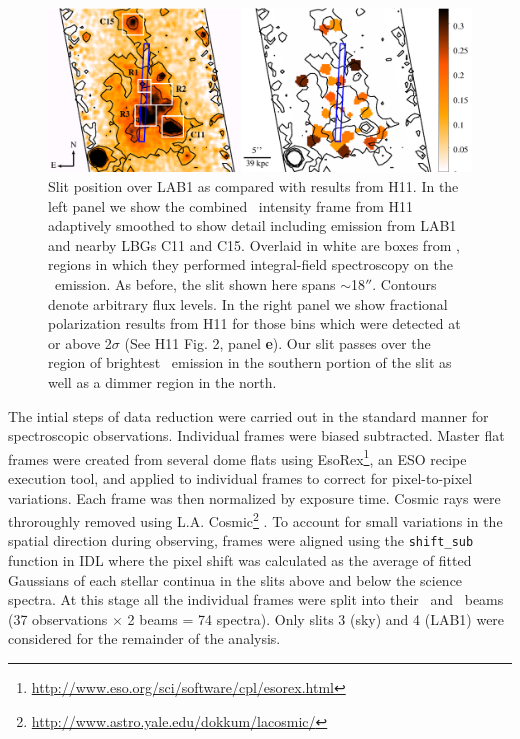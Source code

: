\begin{figure}
\begin{center}
\includegraphics[width=\linewidth]{Figures/lyapol/f2_v2.pdf}
\caption[Slit position over LAB1 as compared with results from Hayes et. 2011]{Slit position over LAB1 as compared with results from H11. In the left panel we show the combined \lya~intensity frame from H11 adaptively smoothed to show detail including emission from LAB1 and nearby LBGs C11 and C15. Overlaid in white are boxes from \cite{Weijmans2010}, regions in which they performed integral-field spectroscopy on the \lya~emission. As before, the slit shown here spans $\sim$18$''$.  Contours denote arbitrary flux levels. In the right panel we show fractional polarization results from H11 for those bins which were detected at or above 2$\sigma$ (See H11 Fig. 2, panel \textbf{e}). Our slit passes over the region of brightest \lya~emission in the southern portion of the slit as well as a dimmer region in the north.}
\label{fig: slit}
\end{center}
\end{figure}

The intial steps of data reduction were carried out in the standard manner for spectroscopic observations. Individual frames were biased subtracted. Master flat frames were created from several dome flats using EsoRex\footnote{\url{http://www.eso.org/sci/software/cpl/esorex.html}}, an ESO recipe execution tool, and applied to individual frames to correct for pixel-to-pixel variations. Each frame was then normalized by exposure time. Cosmic rays were throroughly removed using L.A. Cosmic\footnote{\url{http://www.astro.yale.edu/dokkum/lacosmic/}} \citep{vanDokkum2001}. To account for small variations in the spatial direction during observing, frames were aligned using the \texttt{shift\_sub} function in IDL where the pixel shift was calculated as the average of fitted Gaussians of each stellar continua in the slits above and below the science spectra.   At this stage all the individual frames were split into their \ord~and \ext~beams (37 observations $\times$ 2 beams = 74 spectra). Only slits 3 (sky) and 4 (LAB1) were considered for the remainder of the analysis. 

